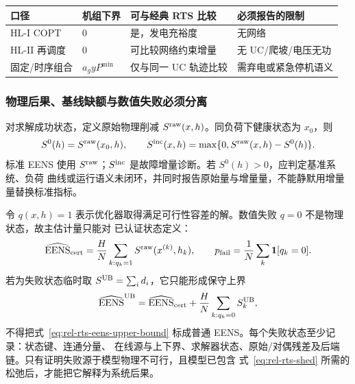 \begin{center}\footnotesize
\begin{tabular}{@{}L{3.2cm}L{3.7cm}L{3.7cm}L{3.7cm}@{}}
\toprule
口径 & 机组下界 & 可与经典 RTS 比较 & 必须报告的限制\\
\midrule
HL-I COPT & $0$ & 是，发电充裕度 & 无网络\\
HL-II 再调度 & $0$ & 可比较网络约束增量 & 无 UC/爬坡/电压无功\\
固定/时序组合 & $a_gyP^{\min}$ & 仅与同一 UC 轨迹比较 & 需弃电或紧急停机语义\\
\bottomrule
\end{tabular}
\end{center}

\subsubsection{物理后果、基线缺额与数值失败必须分离}
对求解成功状态，定义原始物理削减 $S^{\rm raw}(x,h)$。同负荷下健康状态为 $x_0$，则
\begin{equation}
 S^0(h)=S^{\rm raw}(x_0,h),\qquad
 S^{\rm inc}(x,h)=\max\{0,S^{\rm raw}(x,h)-S^0(h)\}.
 \label{eq:rel-rts-raw-incremental}
\end{equation}
标准 EENS 使用 $S^{\rm raw}$；$S^{\rm inc}$ 是故障增量诊断。若 $S^0(h)>0$，应判定基准系统、负荷
曲线或运行语义未闭环，并同时报告原始量与增量量，不能静默用增量量替换标准指标。

令 $q(x,h)=1$ 表示优化器取得满足可行性容差的解。数值失败 $q=0$ 不是物理状态，故主估计量只能对
已认证状态定义：
\begin{equation}
 \widehat{\mathrm{EENS}}_{\rm cert}
 =\frac{H}{N}\sum_{k:q_k=1}S^{\rm raw}(x^{(k)},h_k),\qquad
 p_{\rm fail}=\frac1N\sum_k\mathbf1[q_k=0].
 \label{eq:rel-rts-certified-eens}
\end{equation}
若为失败状态临时取 $S^{\rm UB}=\sum_i d_i$，它只能形成保守上界
\begin{equation}
 \widehat{\mathrm{EENS}}^{\rm UB}
 =\widehat{\mathrm{EENS}}_{\rm cert}
 +\frac{H}{N}\sum_{k:q_k=0}S^{\rm UB}_k,
 \label{eq:rel-rts-eens-upper-bound}
\end{equation}
不得把式~\eqref{eq:rel-rts-eens-upper-bound} 标成普通 EENS。每个失败状态至少记录：状态键、连通分量、
在线源与上下界、求解器状态、原始/对偶残差及后端链。只有证明失败源于模型物理不可行，且模型已包含
式~\eqref{eq:rel-rts-shed} 所需的松弛后，才能把它解释为系统后果。

